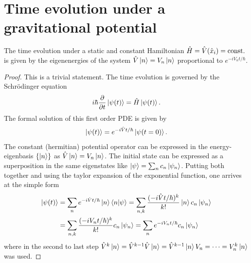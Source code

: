 \section{Time evolution under a gravitational potential}

\begin{proposition} \label{proposition:time-evolution}
  The time evolution under a static and constant Hamiltonian $\hat{H} = \hat{V}(\hat{x}_i) = \mathrm{const.}$ is given by the eigenenergies of the system $\hat{V}\ket{n} = V_n\ket{n}$ proportional to $e^{-iV_nt/\hbar}$.
\end{proposition}
\begin{proof}
  This is a trivial statement. The time evolution is governed by the Schrödinger equation
  \begin{equation}
    i\hbar \pdv{t}\ket{\psi(t)} = \hat{H} \ket{\psi(t)} .
  \end{equation}
  The formal solution of this first order PDE is given by
  \begin{equation}
    \ket{\psi(t)} = e^{-i\hat{V}t/\hbar} \ket{\psi(t=0)} .
  \end{equation}
  The constant (hermitian) potential operator can be expressed in the energy-eigenbasis $\left\{\ket{n}\right\}$ as $\hat{V}\ket{n} = V_n\ket{n}$. The initial state can be expressed as a superposition in the same eigenstates like $\ket{\psi} = \sum_n c_n \ket{\psi_n}$. Putting both together and using the taylor expansion of the exponential function, one arrives at the simple form
  \begin{align}
    \ket{\psi(t)} &= \sum_n e^{-i\hat{V}t/\hbar} \ket{n} \braket{n}{\psi} = \sum_{n,k} \frac{(-i\hat{V}t/\hbar)^k}{k!} \ket{n} c_n \ket{\psi_n} \\
    &= \sum_{n,k} \frac{(-iV_n t/\hbar)^k}{k!} c_n \ket{\psi_n} 
    = \sum_n e^{-iV_nt/\hbar} c_n \ket{\psi_n}
  \end{align}
  where in the second to last step $\hat{V}^k\ket{n} = \hat{V}^{k-1}\hat{V}\ket{n} = \hat{V}^{k-1}\ket{n} V_n = \dots = V_n^k\ket{n}$ was used.
\end{proof}

